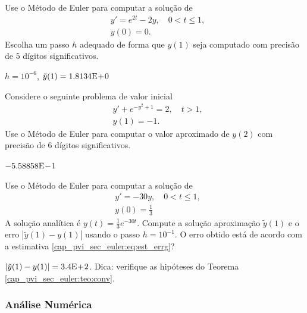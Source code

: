 \begin{exer}
  Use o Método de Euler para computar a solução de
  \begin{subequations}
    \begin{align}
      &y' = e^{2t} - 2y,\quad 0 < t\leq 1,\\
      &y(0) = 0.
    \end{align}
  \end{subequations}
  Escolha um passo $h$ adequado de forma que $y(1)$ seja computado com precisão de $5$ dígitos significativos.
\end{exer}
\begin{resp}
  $h=10^{-6}$, $\tilde{y}(1) = 1.8134\mathrm{E}\!+\!0$
\end{resp}

\begin{exer}
  Considere o seguinte problema de valor inicial
  \begin{subequations}
    \begin{align}
      &y' + e^{-y^2+1} = 2,\quad t>1,\\
      &y(1) = -1.
    \end{align}
\end{subequations}
Use o Método de Euler para computar o valor aproximado de $y(2)$ com precisão de $6$ dígitos significativos.
\end{exer}
\begin{resp}
  $-5.58858\mathrm{E}\!-\!1$
\end{resp}

\begin{exer}
  Use o Método de Euler para computar a solução de
  \begin{subequations}
    \begin{align}
      &y' = -30y,\quad 0 < t\leq 1,\\
      &y(0) = \frac{1}{3}
    \end{align}
  \end{subequations}
  A solução analítica é $y(t) = \frac{1}{3}e^{-30t}$. Compute a solução aproximação $\tilde{y}(1)$ e o erro $|\tilde{y}(1) - y(1)|$ usando o passo $h=10^{-1}$. O erro obtido está de acordo com a estimativa \eqref{cap_pvi_sec_euler:eq:est_errg}?
\end{exer}
\begin{resp}
  $|\tilde{y}(1) - y(1)| = 3.4\mathrm{E}\!+\!2$. Dica: verifique as hipóteses do Teorema \ref{cap_pvi_sec_euler:teo:conv}.
\end{resp}

\subsubsection{Análise Numérica}

